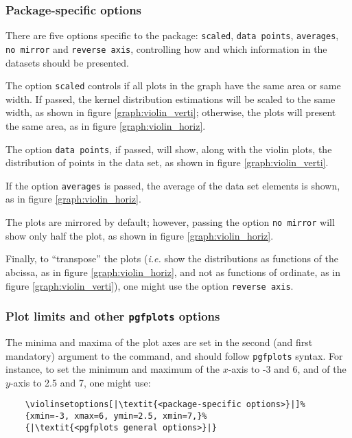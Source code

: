\documentclass{article}
\begin{document}
\subsubsection{Package-specific options}

There are five options specific to the package: \texttt{scaled},
\texttt{data points}, \texttt{averages}, \texttt{no mirror} and
\texttt{reverse axis}, controlling how and which information
in the datasets should be presented.

The option \texttt{scaled} controls if all plots in the graph
have the same area or same width. If passed, the kernel
distribution estimations will be scaled to the same width, as
shown in figure \ref{graph:violin_verti}; otherwise, the plots
will present the same area, as in figure \ref{graph:violin_horiz}.

The option \texttt{data points}, if passed, will show, along with
the violin plots, the distribution of points in the data set, as shown in
figure \ref{graph:violin_verti}.

If the option \texttt{averages} is passed, the average of the data set
elements is shown, as in figure \ref{graph:violin_horiz}.

The plots are mirrored by default; however, passing the option \texttt{no mirror}
will show only half the plot, as shown in figure \ref{graph:violin_horiz}.

Finally, to ``transpose'' the plots (\textit{i.e.} show the distributions
as functions of the abcissa, as in figure \ref{graph:violin_horiz},
and not as functions of ordinate, as in figure \ref{graph:violin_verti}),
one might use the option \texttt{reverse axis}.

\subsubsection{Plot limits and other \texttt{pgfplots} options}

The minima and maxima of the plot axes are set in the second (and first
mandatory) argument to the command, and should follow \texttt{pgfplots}
syntax. For instance, to set the minimum and maximum of the $x$-axis
to -3 and 6, and of the $y$-axis to 2.5 and 7, one might use:

\begin{verbatim}
	\violinsetoptions[|\textit{<package-specific options>}|]%
	{xmin=-3, xmax=6, ymin=2.5, xmin=7,}%
	{|\textit{<pgfplots general options>}|}
\end{verbatim}
\end{document}
